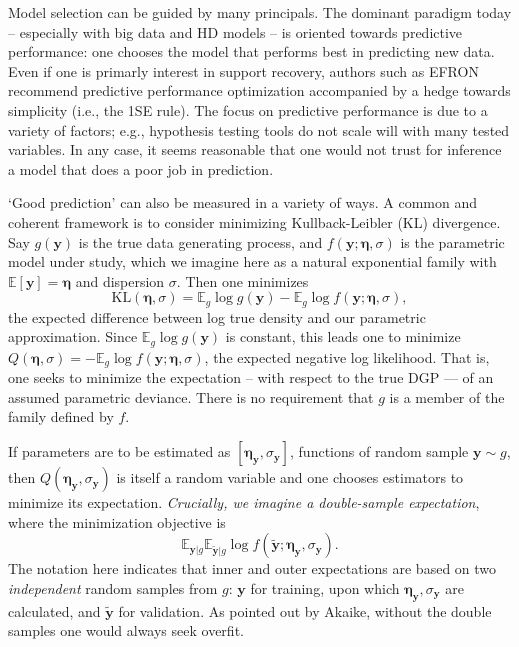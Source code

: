 \documentclass[12pt]{article}
\newcommand{\bs}[1]{\boldsymbol{#1}}
\newcommand{\mr}[1]{\mathrm{#1}}
\newcommand{\bm}[1]{\mathbf{#1}}
\newcommand{\ds}[1]{\mathds{#1}}
\begin{document}
Model selection can be guided by many principals.  The dominant paradigm today
-- especially with big data and HD models -- is oriented towards predictive
performance: one chooses the model that performs best in predicting new data.
Even if one is primarly interest in support recovery, authors such as EFRON
recommend predictive performance optimization accompanied by a hedge towards
simplicity (i.e., the 1SE rule).  The focus on predictive performance is due
to a variety of factors; e.g., hypothesis testing tools do not scale will with
many tested variables.  In any case, it seems reasonable that one would not
trust for inference a model that does a poor job in prediction.

`Good prediction' can also be measured in a variety of ways.  A common and coherent framework is to consider minimizing Kullback-Leibler (KL) divergence.  Say $g(\bm{y})$ is the true data generating process, and $f(\bm{y}; \bs{\eta},\sigma)$ is the parametric model under study, which we imagine here as a natural exponential family  with $\ds{E}[\bm{y}]=\bs{\eta}$ and dispersion $\sigma$. Then one minimizes
\begin{equation}
\mr{KL}(\bs{\eta},\sigma) = \ds{E}_g \log g(\bm{y}) - \ds{E}_g \log f(\bm{y}; \bs{\eta},\sigma),
\end{equation}
the expected difference between log true density and our parametric approximation.  Since $\ds{E}_g \log g(\bm{y})$ is constant, this leads one to minimize 
$Q(\bs{\eta},\sigma) = -\ds{E}_g \log f(\bm{y}; \bs{\eta},\sigma)$, the expected negative log likelihood.  That is, one seeks to minimize the expectation -- with respect to the true DGP --- of an assumed parametric deviance.  There is no requirement that $g$ is a member of the family defined by $f$.

If parameters are to be estimated as $[\bs{\eta}_{\bm{y}},\sigma_{\bm{y}}]$, functions of random sample $\bm{y} \sim g$, then $Q(\bs{\eta}_{\bm{y}},\sigma_{\bm{y}})$ is itself a random variable and one chooses estimators to minimize its expectation.  {\it Crucially, we imagine a double-sample expectation}, where the minimization objective is
\begin{equation}\label{dualexpect}
\ds{E}_{\bm{y}|g} \ds{E}_{\bm{\tilde y}|g} \log f(\bm{\tilde y}; \bs{\eta}_{\bm{y}},\sigma_{\bm{y}}).
\end{equation}
The notation here indicates that inner and outer expectations are based on two {\it independent} random samples from $g$: $\bm{y}$ for training, upon which $\bs{\eta}_{\bm{y}},\sigma_{\bm{y}}$ are calculated, and $\bm{\tilde y}$ for validation.  As pointed out by Akaike, without the double samples one would always seek overfit.
\end{document}
